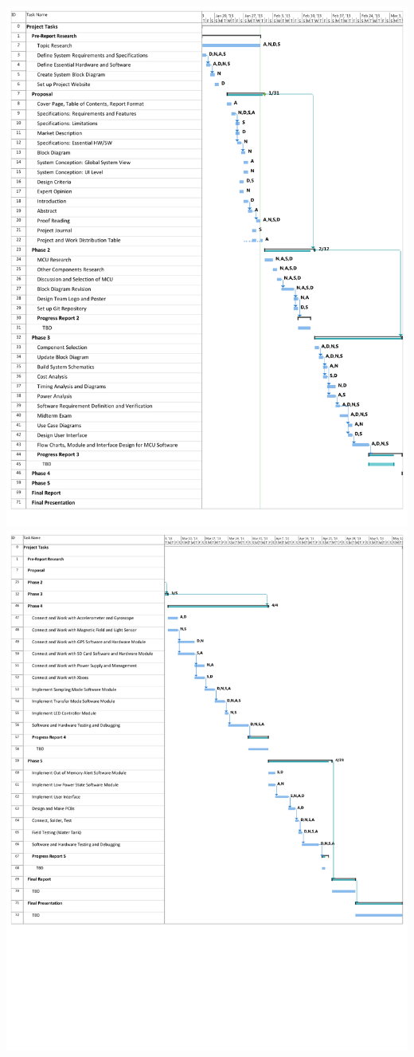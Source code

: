 \documentclass[12pt,letterpaper]{article}
\begin{document}
	\includegraphics[width=\textwidth]{img/GanttPage1}
	\includegraphics[width=\textwidth]{img/GanttPage2}
\end{document}
